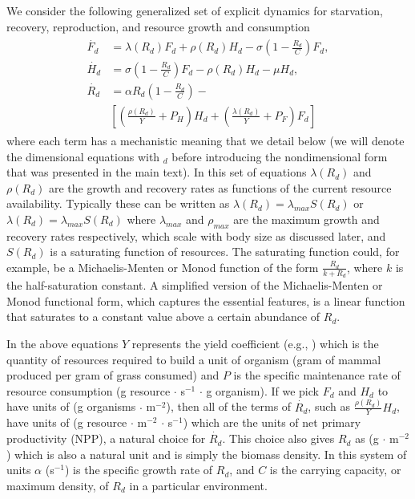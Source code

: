 \documentclass{pnastwo}
\begin{document}
\begin{article}
We consider the following generalized set of explicit dynamics for starvation, recovery, reproduction, and resource growth and consumption
\begin{align}
\begin{split}
\dot{F_{d}} &= \lambda\left(R_{d}\right) F_{d} + \rho\left(R_{d}\right)H_{d} - \sigma \left(1-\frac{R_{d}}{C}\right)F_{d},  \\
\dot{H_{d}} &= \sigma \left(1-\frac{R_{d}}{C}\right)F_{d} - \rho\left(R_{d}\right)H_{d} - \mu H_{d},  \\
\dot{R_{d}} &= \alpha R_{d}\left(1-\frac{R_{d}}{C}\right) - \\
&\left[\left(\frac{\rho\left(R_{d}\right)}{Y}+P_{H}\right)H_{d}+\left(\frac{\lambda\left(R_{d}\right)}{Y}+P_{F}\right)F_{d}\right]
\end{split}
\end{align}
where each term has a mechanistic meaning that we detail below (we will denote the dimensional equations with $_{d}$ before introducing the nondimensional form that was presented in the main text).
In this set of equations $\lambda\left(R_{d}\right)$ and $\rho\left(R_{d}\right)$ are the growth and recovery rates as functions of the current resource availability. Typically these can be written as $\lambda\left(R_{d}\right)=\lambda_{max}S\left(R_{d}\right)$ or $\lambda\left(R_{d}\right)=\lambda_{max}S\left(R_{d}\right)$ where $\lambda_{max}$ and $\rho_{max}$ are the maximum growth and recovery rates respectively, which scale with body size as discussed later, and $S\left(R_{d}\right)$ is a saturating function of resources. The saturating function could, for example, be a Michaelis-Menten or Monod function of the form $\frac{R_{d}}{k+R_{d}}$, where $k$ is the half-saturation constant. A simplified version of the Michaelis-Menten or Monod functional form, which captures the essential features, is a linear function that saturates to a constant value above a certain abundance of $R_{d}$. 

In the above equations $Y$ represents the yield coefficient (e.g., \cite{pirt,Heijnen}) which is the quantity of resources required to build a unit of organism (gram of mammal produced per gram of grass consumed) and $P$ is the specific maintenance rate of resource consumption (g resource $\cdot$ s$^{-1}$ $\cdot$ g organism). If we pick $F_{d}$ and $H_{d}$ to have units of (g organisms $\cdot$ m$^{-2}$), then all of the terms of $\dot{R_{d}}$, such as $\frac{\rho\left(R_{d}\right)}{Y}H_{d}$, have units of (g resource $\cdot$ m$^{-2}$ $\cdot$ s$^{-1}$) which are the units of net primary productivity (NPP), a natural choice for $\dot{R_{d}}$. This choice also gives $R_{d}$ as (g $\cdot$ m$^{-2}$) which is also a natural unit and is simply the biomass density. In this system of units $\alpha$ (s$^{-1}$) is the specific growth rate of $R_{d}$, and $C$ is the carrying capacity, or maximum density, of $R_{d}$ in a particular environment.


\end{article}
\end{document}
